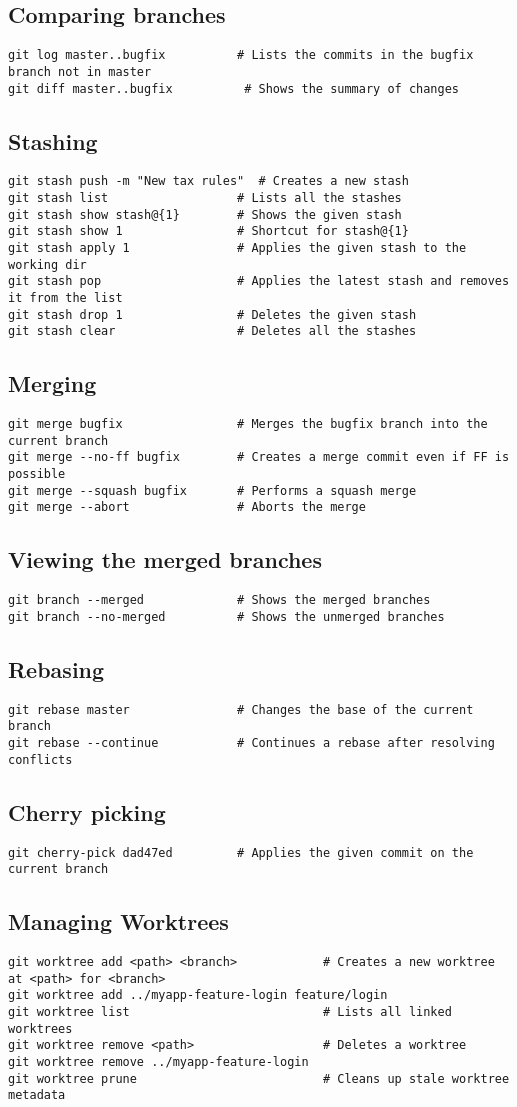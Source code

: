 \documentclass[a4paper,10pt]{article}
\newcommand{\subsectiontitle}[1]{\subsection*{#1}\vspace{-0.3em}}
\begin{document}
\subsectiontitle{Comparing branches}
\begin{verbatim}
git log master..bugfix          # Lists the commits in the bugfix branch not in master
git diff master..bugfix          # Shows the summary of changes
\end{verbatim}

\subsectiontitle{Stashing}
\begin{verbatim}
git stash push -m "New tax rules"  # Creates a new stash
git stash list                  # Lists all the stashes
git stash show stash@{1}        # Shows the given stash
git stash show 1                # Shortcut for stash@{1}
git stash apply 1               # Applies the given stash to the working dir
git stash pop                   # Applies the latest stash and removes it from the list
git stash drop 1                # Deletes the given stash
git stash clear                 # Deletes all the stashes
\end{verbatim}

\subsectiontitle{Merging}
\begin{verbatim}
git merge bugfix                # Merges the bugfix branch into the current branch
git merge --no-ff bugfix        # Creates a merge commit even if FF is possible
git merge --squash bugfix       # Performs a squash merge
git merge --abort               # Aborts the merge
\end{verbatim}

\subsectiontitle{Viewing the merged branches}
\begin{verbatim}
git branch --merged             # Shows the merged branches
git branch --no-merged          # Shows the unmerged branches
\end{verbatim}

\subsectiontitle{Rebasing}
\begin{verbatim}
git rebase master               # Changes the base of the current branch
git rebase --continue           # Continues a rebase after resolving conflicts
\end{verbatim}

\subsectiontitle{Cherry picking}
\begin{verbatim}
git cherry-pick dad47ed         # Applies the given commit on the current branch
\end{verbatim}

\subsectiontitle{Managing Worktrees}
\begin{verbatim}
git worktree add <path> <branch>            # Creates a new worktree at <path> for <branch>
git worktree add ../myapp-feature-login feature/login
git worktree list                           # Lists all linked worktrees
git worktree remove <path>                  # Deletes a worktree
git worktree remove ../myapp-feature-login
git worktree prune                          # Cleans up stale worktree metadata
\end{verbatim}
\end{document}
